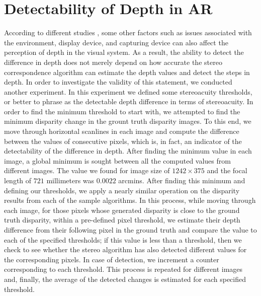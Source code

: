 \section{Detectability of Depth in AR}
According to different studies \cite{dras96, kru10,azuma01}, some other factors such as issues associated with the environment, display device, and capturing device
can also affect the perception of depth in the visual system. As a result, the ability to detect the difference in depth 
does not merely depend on how accurate the stereo correspondence algorithm can estimate the depth values and detect the steps in depth.
In order to investigate the validity of this statement, we conducted another experiment. In this experiment we defined some stereoacuity thresholds,
or better to phrase as the detectable depth difference
in terms of stereoacuity. In order to find the minimum threshold to start with, we attempted to find the 
minimum disparity change in the grount truth disparity images. To this end, we move through horizontal scanlines in each image and 
compute the difference between the values of consecutive pixels, which is, in fact, an indicator of the detectability of the difference in depth. 
After finding the minimum value in each image, a global minimum is sought between all the computed values from different images.
The value we found for image size of $1242\times375$ and the focal length of $721$ millimeters was $0.0022$ arcmins.
After finding this minimum and defining our thresholds, we apply a nearly similar operation on the disparity results from each of the sample algorithms.
In this process, while moving through each image, for those pixels whose generated disparity is close to the ground truth disparity, within a pre-defined pixel threshold, 
we estimate their depth difference from their following pixel
in the ground truth and compare the value to each of the specified thresholds; if this value is less than a threshold, then we check to see whether
the stereo algorithm has also detected different values for the corresponding pixels. 
In case of detection, we increment a counter corresponding to each threshold.
This process is repeated for different images and, finally, the average of the detected changes is estimated for each specified threshold.

